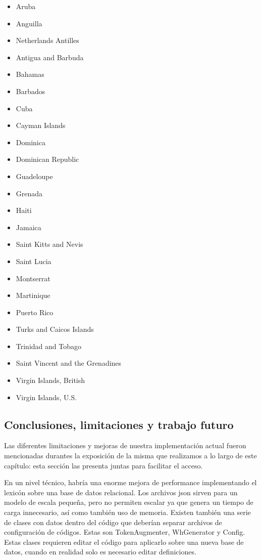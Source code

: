 \begin{itemize}
 \item Aruba
 \item Anguilla
 \item Netherlands Antilles
 \item Antigua and Barbuda
 \item Bahamas
 \item Barbados
 \item Cuba
 \item Cayman Islands
 \item Dominica
 \item Dominican Republic
 \item Guadeloupe
 \item Grenada
 \item Haiti
 \item Jamaica
 \item Saint Kitts and Nevis
 \item Saint Lucia
 \item Montserrat
 \item Martinique
 \item Puerto Rico
 \item Turks and Caicos Islands
 \item Trinidad and Tobago
 \item Saint Vincent and the Grenadines
 \item Virgin Islands, British
 \item Virgin Islands, U.S.
\end{itemize}


\subsection{Conclusiones, limitaciones y trabajo futuro}
\label{subsec:popescu-cierre}

Las diferentes limitaciones y mejoras de nuestra implementación actual fueron mencionadas durantes la exposición de la misma que realizamos a lo largo de este capítulo: esta sección las presenta juntas para facilitar el acceso.

En un nivel técnico, habría una enorme mejora de performance implementando el lexicón sobre una base de datos relacional. Los archivos json sirven para un modelo de escala pequeña, pero no permiten escalar ya que genera un tiempo de carga innecesario, así como también uso de memoria. Existen también una serie de clases con datos dentro del código que deberían separar archivos de configuración de códigos. Estas son TokenAugmenter, WhGenerator y Config. Estas clases requieren editar el código para aplicarlo sobre una nueva base de datos, cuando en realidad solo es necesario editar definiciones.

